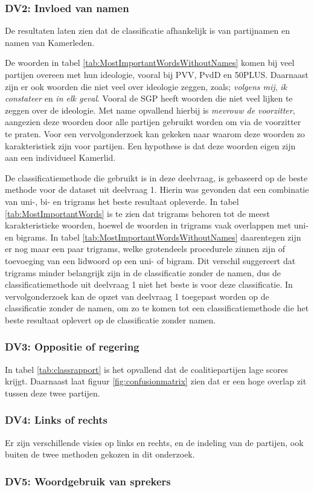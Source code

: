 \subsubsection{DV2: Invloed van namen}
De resultaten laten zien dat de classificatie afhankelijk is van partijnamen en namen van Kamerleden.\par
De woorden in tabel \ref{tab:MostImportantWordsWithoutNames} komen bij veel partijen overeen met hun ideologie, vooral bij PVV, PvdD en 50PLUS. Daarnaast zijn er ook woorden die niet veel over ideologie zeggen, zoals; \textit{volgens mij}, \textit{ik constateer} en \textit{in elk geval}. Vooral de SGP heeft woorden die niet veel lijken te zeggen over de ideologie. Met name opvallend hierbij is \textit{mevrouw de voorzitter}, aangezien deze woorden door alle partijen gebruikt worden om via de voorzitter te praten. Voor een vervolgonderzoek kan gekeken naar waarom deze woorden zo karakteristiek zijn voor partijen. Een hypothese is dat deze woorden eigen zijn aan een individueel Kamerlid.\par
De classificatiemethode die gebruikt is in deze deelvraag, is gebaseerd op de beste methode voor de dataset uit deelvraag 1. Hierin was gevonden dat een combinatie van uni-, bi- en trigrams het beste resultaat opleverde. In tabel \ref{tab:MostImportantWords} is te zien dat trigrams behoren tot de meest karakteristieke woorden, hoewel de woorden in trigrams vaak overlappen met uni- en bigrams. In tabel \ref{tab:MostImportantWordsWithoutNames} daarentegen zijn er nog maar een paar trigrams, welke grotendeels procedurele zinnen zijn of toevoeging van een lidwoord op een uni- of bigram. Dit verschil suggereert dat trigrams minder belangrijk zijn in de classificatie zonder de namen, dus de classificatiemethode uit deelvraag 1 niet het beste is voor deze classificatie. In vervolgonderzoek kan de opzet van deelvraag 1 toegepast worden op de classificatie zonder de namen, om zo te komen tot een classificatiemethode die het beste resultaat oplevert op de classificatie zonder namen.\par 

\subsubsection{DV3: Oppositie of regering}
In tabel \ref{tab:classrapport} is het opvallend dat de coalitiepartijen lage scores krijgt. Daarnaast laat figuur \ref{fig:confusionmatrix} zien dat er een hoge overlap zit tussen deze twee partijen.\par

\subsubsection{DV4: Links of rechts}
Er zijn verschillende visies op links en rechts, en de indeling van de partijen, ook buiten de twee methoden gekozen in dit onderzoek.\par

\subsubsection{DV5: Woordgebruik van sprekers}